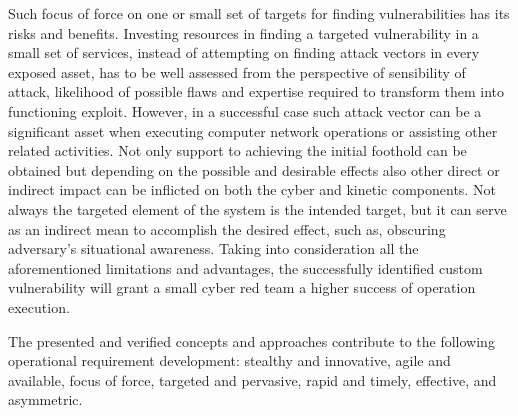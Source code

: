 Such focus of force on one or small set of targets for finding vulnerabilities has its risks and benefits. Investing resources in finding a targeted vulnerability in a small set of services, instead of attempting on finding attack vectors in every exposed asset, has to be well assessed from the perspective of sensibility of attack, likelihood of possible flaws and expertise required to transform them into functioning exploit. However, in a successful case such attack vector can be a significant asset when executing computer network operations or assisting other related activities. Not only support to achieving the initial foothold can be obtained but depending on the possible and desirable effects also other direct or indirect impact can be inflicted on both the cyber and kinetic components. Not always the targeted element of the system is the intended target, but it can serve as an indirect mean to accomplish the desired effect, such as, obscuring adversary's situational awareness. 
Taking into consideration all the aforementioned limitations and advantages, the successfully identified custom vulnerability will grant a small cyber red team a higher success of operation execution.

The presented and verified concepts and approaches contribute to the following operational requirement development:
stealthy and innovative,
agile and available,
focus of force,
targeted and pervasive,
rapid and timely,
effective, and
asymmetric.


